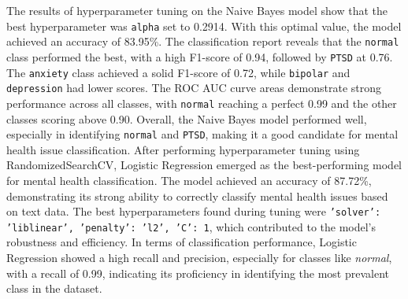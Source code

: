 \noindent
The results of hyperparameter tuning on the Naive Bayes model show that the best hyperparameter was \texttt{alpha} set to 0.2914. With this optimal value, the model achieved an accuracy of 83.95\%. The classification report reveals that the \texttt{normal} class performed the best, with a high F1-score of 0.94, followed by \texttt{PTSD} at 0.76. The \texttt{anxiety} class achieved a solid F1-score of 0.72, while \texttt{bipolar} and \texttt{depression} had lower scores. The ROC AUC curve areas demonstrate strong performance across all classes, with \texttt{normal} reaching a perfect 0.99 and the other classes scoring above 0.90. Overall, the Naive Bayes model performed well, especially in identifying \texttt{normal} and \texttt{PTSD}, making it a good candidate for mental health issue classification. After performing hyperparameter tuning using RandomizedSearchCV, Logistic Regression emerged as the best-performing model for mental health classification. The model achieved an accuracy of 87.72\%, demonstrating its strong ability to correctly classify mental health issues based on text data. The best hyperparameters found during tuning were \texttt{'solver': 'liblinear', 'penalty': 'l2', 'C': 1}, which contributed to the model's robustness and efficiency. In terms of classification performance, Logistic Regression showed a high recall and precision, especially for classes like \textit{normal}, with a recall of 0.99, indicating its proficiency in identifying the most prevalent class in the dataset. 

